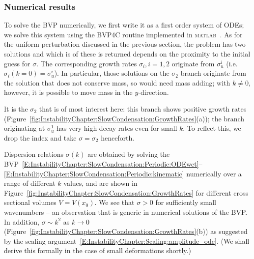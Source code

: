 \subsubsection{Numerical results}\label{S:InstabilityChapter:NoCond:Numerics}
To solve the BVP numerically, we first write it as a first order system of ODEs; we solve this system using the BVP4C routine implemented in \textsc{matlab}~\citep{Kierzenka2001BVP}.
As for the uniform perturbation discussed in the previous section, the problem has two solutions and which is of these is returned depends on the proximity to the initial guess for $\sigma$. The corresponding growth rates $\sigma_i, i = 1,2$ originate from $\sigma_u^i$ (i.e.~$\sigma_i(k= 0) = \sigma_u^i$). In particular, those solutions on the $\sigma_2$ branch originate from the solution that does not conserve mass, so would need mass adding; with $k \neq 0$, however, it is possible to move mass in the $y$-direction.

It is the $\sigma_2$ that is of most interest here: this branch shows positive growth rates (Figure~\ref{fig:InstabilityChapter:SlowCondensation:GrowthRates}(a)); the branch originating at $\sigma_u^1$ has very high decay rates even for small $k$. To reflect this, we drop the index and take $\sigma =  \sigma_2$ henceforth.

Dispersion relations $\sigma(k)$ are obtained by solving the BVP~\eqref{E:InstabilityChapter:SlowCondensation:Periodic:ODEwet}--\eqref{E:InstabilityChapter:SlowCondensation:Periodic:kinematic} numerically over a range of different $k$ values, and are shown in Figure~\ref{fig:InstabilityChapter:SlowCondensation:GrowthRates} for different cross sectional volumes $V = V(x_0)$. We see that $\sigma > 0$ for sufficiently small wavenumbers -- an observation that is generic in numerical solutions of the BVP. In addition, $\sigma\sim k^2$ as $k \to 0$ (Figure~\ref{fig:InstabilityChapter:SlowCondensation:GrowthRates}(b)) as suggested by the scaling argument~\eqref{E:InstabilityChapter:Scaling:amplitude_ode}. (We shall derive this formally in the case of small deformations shortly.)

